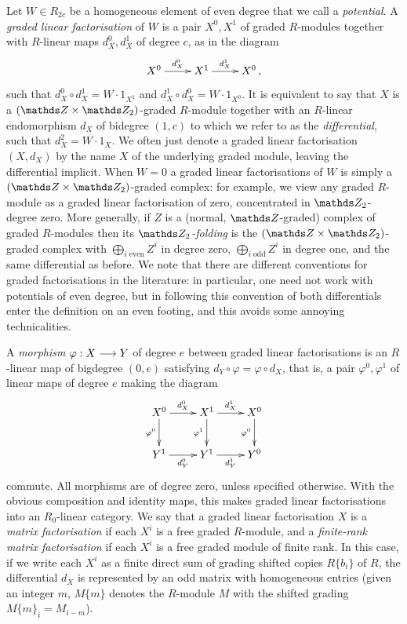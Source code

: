 \documentclass{compositio}
\theoremstyle{definition}
\numberwithin{equation}{section}
\begin{document}
Let $W \in R_{2c}$ be a homogeneous element of even degree that we call a \emph{potential}. A \emph{graded linear factorisation} of $W$ is a pair $X^0, X^1$ of graded $R$-modules together with $R$-linear maps $d_X^0, d_X^1$ of degree $c$, as in the diagram
\[
\xymatrix{
X^0 \ar[r]^-{d_X^0} & X^1 \ar[r]^-{d_X^1} & X^0\,,
}
\]
such that $d_X^0 \circ d_X^1 = W \cdot 1_{X^1}$ and $d_X^1 \circ d_X^0  = W \cdot 1_{X^0}$. It is equivalent to say that $X$ is a $(\ZZ \times \Ztwo)$-graded $R$-module together with an $R$-linear endomorphism $d_X$ of bidegree $(1,c)$ to which we refer to as the \emph{differential}, such that $d_X^2 = W \cdot 1_X$. We often just denote a graded linear factorisation $(X,d_X)$ by the name $X$ of the underlying graded module, leaving the differential implicit. When $W = 0$ a graded linear factorisations of $W$ is simply a $(\ZZ \times \Ztwo)$-graded complex: for example, we view any graded $R$-module as a graded linear factorisation of zero, concentrated in $\nZ_{2}$-degree zero. More generally, if $Z$ is a (normal, $\ZZ$-graded) complex of graded $R$-modules then its \emph{$\Ztwo$-folding} is the $(\ZZ \times \Ztwo)$-graded complex with $\bigoplus_{i\;\text{even}} Z^i$ in degree zero, $\bigoplus_{i\;\text{odd}} Z^i$ in degree one, and the same differential as before. We note that there are different conventions for graded factorisations in the literature: in particular, one need not work with potentials of even degree, but in following this convention of \cite{kr0401268} both differentials enter the definition on an even footing, and this avoids some annoying technicalities.

A \emph{morphism} $\varphi: X \longrightarrow Y$ of degree $e$ between graded linear factorisations is an $R$-linear map of bigdegree $(0, e)$ satisfying $d_Y \circ \varphi = \varphi \circ d_X$, that is, a pair $\varphi^0, \varphi^1$ of linear maps of degree $e$ making the diagram
\[
\xymatrix{
X^0 \ar[d]_-{\varphi^0} \ar[r]^-{d_X^0} & X^1 \ar[d]_-{\varphi^1} \ar[r]^-{d_X^1} & X^0 \ar[d]_-{\varphi^0}\\
Y^1 \ar[r]_-{d_Y^0} & Y^1 \ar[r]_-{d_Y^1} & Y^0
}
\] 
commute. All morphisms are of degree zero, unless specified otherwise. With the obvious composition and identity maps, this makes graded linear factorisations into an $R_0$-linear category. We say that a graded linear factorisation $X$ is a \emph{matrix factorisation} if each $X^i$ is a free graded $R$-module, and a \emph{finite-rank matrix factorisation} if each $X^i$ is a free graded module of finite rank. In this case, if we write each $X^i$ as a finite direct sum of grading shifted copies $R\{ b_i \}$ of $R$, the differential $d_X$ is represented by an odd matrix with homogeneous entries (given an integer $m$, $M\{ m \}$ denotes the $R$-module $M$ with the shifted grading $M\{ m \}_i = M_{i - m}$).
\end{document}
